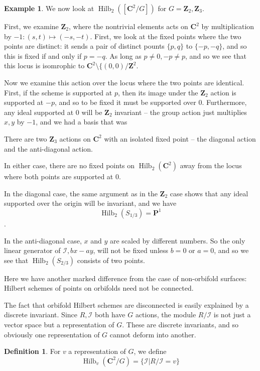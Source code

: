\documentclass{amsart}[12pt]
\theoremstyle{definition}
\newtheorem{example}[dummy]{Example}
\newtheorem{definition}[dummy]{Definition}
\newcommand{\Z}{\mathbf{Z}}
\newcommand{\C}{\mathbf{C}}
\newcommand{\proj}{\mathbf{P}}
\DeclareMathOperator{\Hilb}{Hilb}
\begin{document}
\begin{example}
We now look at $\Hilb_2([\C^2/G])$ for $G=\Z_2, \Z_3$.  

First, we examine $\Z_2$, where the nontrivial elements acts on $\C^2$ by multiplication by $-1: (s,t)\mapsto (-s,-t)$.  First, we look at the fixed points where the two points are distinct: it sends a pair of distinct pounts $\{p,q\}$ to $\{-p,-q\}$, and so this is fixed if and only if $p=-q$.  As long as $p\neq 0, -p\neq p$, and so we see that this locus is isomrophic to $\C^2\setminus\{(0,0)/\Z^2$.

Now we examine this action over the locus where the two points are identical.  First, if the scheme is supported at $p$, then its image under the $\Z_2$ action is supported at $-p$, and so to be fixed it must be supported over $0$.  Furthermore, any ideal supported at $0$ will be $\Z_2$ invariant -- the group action just multiplies $x, y$ by $-1$, and we had a basis that was

There are two $\Z_3$ actions on $\C^2$ with an isolated fixed point -- the diagonal action and the anti-diagonal action.

In either case, there are no fixed points on $\Hilb_2(\C^2)$ away from the locus where both points are supported at 0.  

In the diagonal case, the same argument as in the $\Z_2$ case shows that any ideal supported over the origin will be invariant, and we have
$$\Hilb_2(S_{1/3})=\proj^1$$.

In the anti-diagonal case, $x$ and $y$ are scaled by different numbers.  So the only linear generator of $\mathcal{I}, bx-ay$, will not be fixed unless $b=0$ or $a=0$, and so we see that $\Hilb_2(S_{2/3})$ consists of two points.  

Here we have another marked difference from the case of non-orbifold surfaces: Hilbert schemes of points on orbifolds need not be connected.

\end{example}

The fact that orbifold Hilbert schemes are disconnected is easily explained by a discrete invariant.  Since $R, \mathcal{I}$ both have $G$ actions, the module $R/\mathcal{I}$ is not just a vector space but a representation of $G$.  These are discrete invariants, and so obviously one representation of $G$ cannot deform into another.  

\begin{definition}
For $v$ a representation of $G$, we define
$$\Hilb_v(\C^2/G)=\{\mathcal{I}|R/\mathcal{I}=v\}$$
\end{definition}
\end{document}
